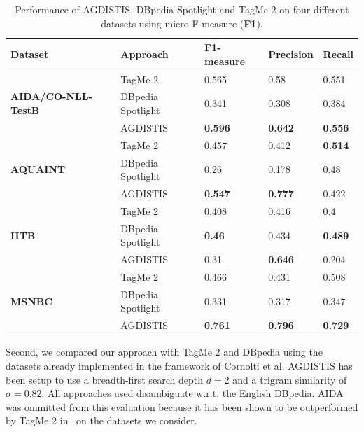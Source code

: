 \documentclass{llncs}
\begin{document}
\begin{table}
    \centering
\caption{Performance of AGDISTIS, DBpedia Spotlight and TagMe 2 on four different datasets using micro F-measure (\textbf{F1}).}
\begin{tabular}[tb]{@{}lllll@{}}
\toprule
Dataset                            & Approach          & \textbf{F1-measure}             & \textbf{Precision} & \textbf{Recall} \\ \midrule
\multirow{3}{*}{\begin{minipage}{0.8in}\textbf{AIDA/CO-NLL-TestB}\end{minipage}} & TagMe 2           & 0.565          & 0.58      & 0.551  \\
                                   & DBpedia Spotlight & 0.341          & 0.308     & 0.384  \\
                                   & AGDISTIS          & \textbf{0.596} & \textbf{0.642}     & \textbf{0.556}  \\ \midrule
\multirow{3}{*}{\textbf{AQUAINT}}  & TagMe 2           & 0.457          & 0.412     & \textbf{0.514}  \\
                                   & DBpedia Spotlight & 0.26           & 0.178     & 0.48   \\
                                   & AGDISTIS          & \textbf{0.547} & \textbf{0.777}     & 0.422  \\\midrule
\multirow{3}{*}{\textbf{IITB}}     & TagMe 2           & 0.408          & 0.416     & 0.4    \\
                                   & DBpedia Spotlight & \textbf{0.46}  & 0.434     & \textbf{0.489}  \\
                                   & AGDISTIS          & 0.31           & \textbf{0.646}     & 0.204  \\\midrule
\multirow{3}{*}{\textbf{MSNBC}}    & TagMe 2           & 0.466          & 0.431     & 0.508  \\
                                   & DBpedia Spotlight & 0.331          & 0.317     & 0.347  \\
                                   & AGDISTIS          & \textbf{0.761} & \textbf{0.796}     & \textbf{0.729}  \\ \bottomrule
\end{tabular}
\label{tab:evalnew}
\end{table}

Second, we compared our approach with TagMe 2 and DBpedia using the datasets already implemented in the framework of Cornolti et al.
AGDISTIS has been setup to use a breadth-first search depth $d=2$ and a trigram similarity of $\sigma=0.82$.
All approaches used disambiguate w.r.t. the English DBpedia.
AIDA was ommitted from this evaluation because it has been shown to be outperformed by TagMe 2 in~\cite{Cornolti} on the datasets we consider. 
\end{document}
